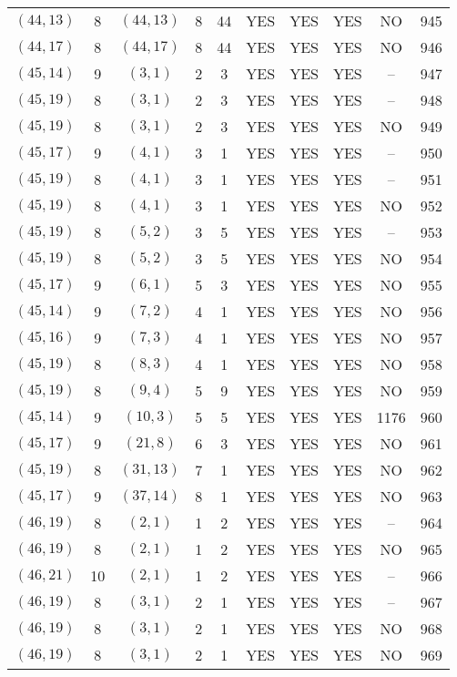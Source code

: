 \begin{longtable}{|c|c|c|c|c|c|c|c|c|c|}
$(44, 13)$ & 8 & $(44, 13)$ & 8 & 44 & YES & YES & YES & NO & 945\\
$(44, 17)$ & 8 & $(44, 17)$ & 8 & 44 & YES & YES & YES & NO & 946\\
$(45, 14)$ & 9 & $(3, 1)$ & 2 & 3 & YES & YES & YES & -- & 947\\
$(45, 19)$ & 8 & $(3, 1)$ & 2 & 3 & YES & YES & YES & -- & 948\\
$(45, 19)$ & 8 & $(3, 1)$ & 2 & 3 & YES & YES & YES & NO & 949\\
$(45, 17)$ & 9 & $(4, 1)$ & 3 & 1 & YES & YES & YES & -- & 950\\
$(45, 19)$ & 8 & $(4, 1)$ & 3 & 1 & YES & YES & YES & -- & 951\\
$(45, 19)$ & 8 & $(4, 1)$ & 3 & 1 & YES & YES & YES & NO & 952\\
$(45, 19)$ & 8 & $(5, 2)$ & 3 & 5 & YES & YES & YES & -- & 953\\
$(45, 19)$ & 8 & $(5, 2)$ & 3 & 5 & YES & YES & YES & NO & 954\\
$(45, 17)$ & 9 & $(6, 1)$ & 5 & 3 & YES & YES & YES & NO & 955\\
$(45, 14)$ & 9 & $(7, 2)$ & 4 & 1 & YES & YES & YES & NO & 956\\
$(45, 16)$ & 9 & $(7, 3)$ & 4 & 1 & YES & YES & YES & NO & 957\\
$(45, 19)$ & 8 & $(8, 3)$ & 4 & 1 & YES & YES & YES & NO & 958\\
$(45, 19)$ & 8 & $(9, 4)$ & 5 & 9 & YES & YES & YES & NO & 959\\
$(45, 14)$ & 9 & $(10, 3)$ & 5 & 5 & YES & YES & YES & 1176 & 960\\
$(45, 17)$ & 9 & $(21, 8)$ & 6 & 3 & YES & YES & YES & NO & 961\\
$(45, 19)$ & 8 & $(31, 13)$ & 7 & 1 & YES & YES & YES & NO & 962\\
$(45, 17)$ & 9 & $(37, 14)$ & 8 & 1 & YES & YES & YES & NO & 963\\
$(46, 19)$ & 8 & $(2, 1)$ & 1 & 2 & YES & YES & YES & -- & 964\\
$(46, 19)$ & 8 & $(2, 1)$ & 1 & 2 & YES & YES & YES & NO & 965\\
$(46, 21)$ & 10 & $(2, 1)$ & 1 & 2 & YES & YES & YES & -- & 966\\
$(46, 19)$ & 8 & $(3, 1)$ & 2 & 1 & YES & YES & YES & -- & 967\\
$(46, 19)$ & 8 & $(3, 1)$ & 2 & 1 & YES & YES & YES & NO & 968\\
$(46, 19)$ & 8 & $(3, 1)$ & 2 & 1 & YES & YES & YES & NO & 969\\

\end{longtable}

